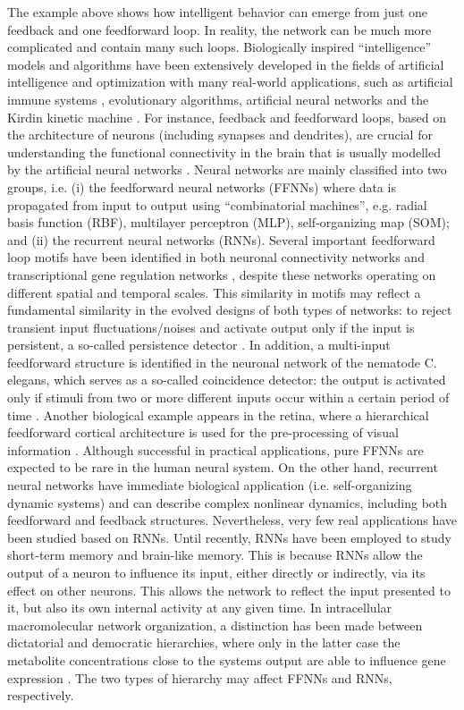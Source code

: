 The example above shows how intelligent behavior can emerge from just one feedback and one feedforward loop. In reality, the network can be much more complicated and contain many such loops. Biologically inspired ``intelligence'' models and algorithms have been extensively developed in the fields of artificial intelligence and optimization with many real-world applications, such as artificial immune systems \cite{smith_immune_2008}, evolutionary algorithms, artificial neural networks \cite{rolls_neural_1998} and the Kirdin kinetic machine \cite{1999_parallel_1999}. For instance, feedback and feedforward loops, based on the architecture of neurons (including synapses and dendrites), are crucial for understanding the functional connectivity in the brain that is usually modelled by the artificial neural networks \cite{rolls_neural_1998}. Neural networks are mainly classified into two groups, i.e. (i) the feedforward neural networks (FFNNs) where data is propagated from input to output using “combinatorial machines”, e.g. radial basis function (RBF), multilayer perceptron (MLP), self-organizing map (SOM); and (ii) the recurrent neural networks (RNNs). Several important feedforward loop motifs have been identified in both neuronal connectivity networks and transcriptional gene regulation networks \cite{milo_network_2002}, despite these networks operating on different spatial and temporal scales. This similarity in motifs may reflect a fundamental similarity in the evolved designs of both types of networks: to reject transient input fluctuations/noises and activate output only if the input is persistent, a so-called persistence detector \cite{alon_network_2007}. In addition, a multi-input feedforward structure is identified in the neuronal network of the nematode C. elegans, which serves as a so-called coincidence detector: the output is activated only if stimuli from two or more different inputs occur within a certain period of time \cite{kashtan_varying_2007,alon_network_2007}. Another biological example appears in the retina, where a hierarchical feedforward cortical architecture is used for the pre-processing of visual information \cite{sanger_optimal_1989}. Although successful in practical applications, pure FFNNs are expected to be rare in the human neural system. On the other hand, recurrent neural networks have immediate biological application (i.e. self-organizing dynamic systems) and can describe complex nonlinear dynamics, including both feedforward and feedback structures. Nevertheless, very few real applications have been studied based on RNNs. Until recently, RNNs have been employed to study short-term memory and brain-like memory. This is because RNNs allow the output of a neuron to influence its input, either directly or indirectly, via its effect on other neurons. This allows the network to reflect the input presented to it, but also its own internal activity at any given time. In intracellular macromolecular network organization, a distinction has been made between dictatorial and democratic hierarchies, where only in the latter case the metabolite concentrations close to the systems output are able to influence gene expression \cite{westerhoff_dynamical_1990,snoep_dna_2002}. The two types of hierarchy may affect FFNNs and RNNs, respectively.

